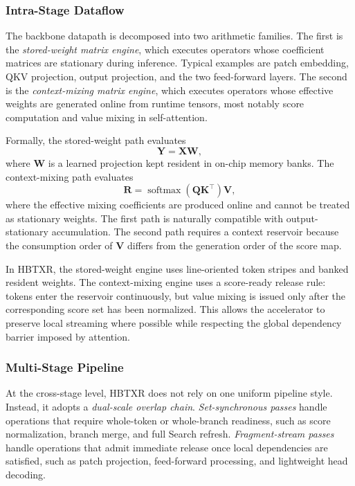 \documentclass[journal]{IEEEtran}
\begin{document}
\subsubsection{Intra-Stage Dataflow}
The backbone datapath is decomposed into two arithmetic families. The first is the \emph{stored-weight matrix engine}, which executes operators whose coefficient matrices are stationary during inference. Typical examples are patch embedding, QKV projection, output projection, and the two feed-forward layers. The second is the \emph{context-mixing matrix engine}, which executes operators whose effective weights are generated online from runtime tensors, most notably score computation and value mixing in self-attention.

Formally, the stored-weight path evaluates
\begin{equation}
\mathbf{Y}=\mathbf{X}\mathbf{W},
\end{equation}
where $\mathbf{W}$ is a learned projection kept resident in on-chip memory banks. The context-mixing path evaluates
\begin{equation}
\mathbf{R}=\operatorname{softmax}(\mathbf{Q}\mathbf{K}^{\top})\mathbf{V},
\end{equation}
where the effective mixing coefficients are produced online and cannot be treated as stationary weights. The first path is naturally compatible with output-stationary accumulation. The second path requires a context reservoir because the consumption order of $\mathbf{V}$ differs from the generation order of the score map.

In HBTXR, the stored-weight engine uses line-oriented token stripes and banked resident weights. The context-mixing engine uses a score-ready release rule: tokens enter the reservoir continuously, but value mixing is issued only after the corresponding score set has been normalized. This allows the accelerator to preserve local streaming where possible while respecting the global dependency barrier imposed by attention.

\subsubsection{Multi-Stage Pipeline}
At the cross-stage level, HBTXR does not rely on one uniform pipeline style. Instead, it adopts a \emph{dual-scale overlap chain}. \emph{Set-synchronous passes} handle operations that require whole-token or whole-branch readiness, such as score normalization, branch merge, and full Search refresh. \emph{Fragment-stream passes} handle operations that admit immediate release once local dependencies are satisfied, such as patch projection, feed-forward processing, and lightweight head decoding.
\end{document}
